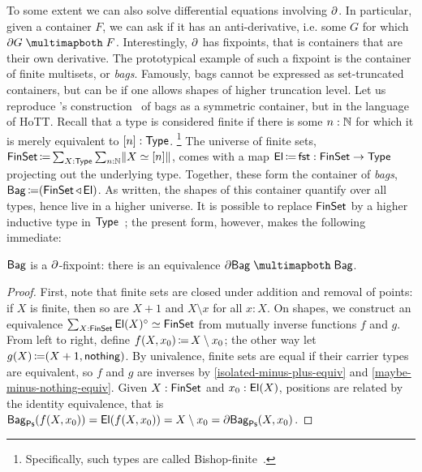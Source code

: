 To some extent we can also solve differential equations involving \( \partial \).
In particular, given a container \( F \), we can ask if it has an anti-derivative,
i.e. some \( G \) for which \( \CartIso{\Der{G}}{F} \).
Interestingly, \( \partial \) has fixpoints, that is containers that are their own derivative.
The prototypical example of such a fixpoint is the container of finite multisets, or \emph{bags}.
Famously, bags cannot be expressed as set-truncated containers, but can be if one allows shapes of higher truncation level.
Let us reproduce \citeauthor{Gylterud2011}'s construction~\cite[{Example~3.6.1}]{Gylterud2011} of bags as a symmetric container,
but in the language of HoTT.
Recall that a type is considered finite
if there is some \( n : \operatorname{\mathbb{N}} \) for which it is merely equivalent to \( \lbrack n\rbrack : \operatorname{\mathsf{Type}} \).%
\footnote{Specifically, such types are called Bishop-finite~\cite[{Definition~4.4}]{FruminEtAl2018FiniteSetsHomotopy}.}
The universe of finite sets,
\( \operatorname{\mathsf{FinSet}} \operatorname{\mathrel{\coloneq}} \sum_{X : \operatorname{\mathsf{Type}}} \sum_{n : \operatorname{\mathbb{N}}} \lVert X \simeq \lbrack n\rbrack \rVert \),
comes with a map \( \operatorname{\mathsf{El}} \operatorname{\mathrel{\coloneq}} \operatorname{\mathsf{fst}} : \operatorname{\mathsf{FinSet}} \to \operatorname{\mathsf{Type}} \) projecting out the underlying type.
Together, these form the container of \emph{bags}, \( \operatorname{\mathsf{Bag}} \operatorname{\mathrel{\coloneq}} (\operatorname{\mathsf{FinSet}}\mathbin{\triangleleft}\operatorname{\mathsf{El}}) \).
As written, the shapes of this container quantify over all types, hence live in a higher universe.
It is possible to replace \( \operatorname{\mathsf{FinSet}} \) by a higher inductive type in \( \operatorname{\mathsf{Type}} \)~\cite[Theorem~25]{FinsterEtAl2021CartesianBicategoryPolynomial};
the present form, however, makes the following immediate:
\begin{proposition}\label{bag-fixed-point}
  \( \operatorname{\mathsf{Bag}} \) is a \( \partial \)-fixpoint:
  there is an equivalence \( \CartIso{\Der{\Bag}}{\Bag} \).
  \begin{proof}
    First, note that finite sets are closed under addition and removal of points:
    if \( X \) is finite, then so are \( X + 1 \) and \( X \setminus x \) for all \( x : X \).
    On shapes, we construct an equivalence
    \(
      \sum_{X : \operatorname{\mathsf{FinSet}}} \operatorname{\mathsf{El}}(X)^{\circ} \simeq \operatorname{\mathsf{FinSet}}
    \)
    from mutually inverse functions \( f \) and \( g \).
    From left to right, define \( f(X, x_0) \operatorname{\mathrel{\coloneq}} X \setminus x_0 \);
    the other way let \( g(X) \operatorname{\mathrel{\coloneq}} (X + 1 , \operatorname{\mathsf{nothing}}) \).
    By univalence, finite sets are equal if their carrier types are equivalent,
    so \( f \) and \( g \) are inverses by \autoref{isolated-minus-plus-equiv} and \autoref{maybe-minus-nothing-equiv}.
    Given \( X : \operatorname{\mathsf{FinSet}} \) and \( x_0 : \operatorname{\mathsf{El}}(X) \), positions are related by the identity equivalence,
    that is
    \(
      \operatorname{\mathsf{Bag}}_{\operatorname{\mathsf{Ps}}}(f(X, x_0)) = \operatorname{\mathsf{El}}(f(X, x_0)) = X \setminus x_0 = \partial{\operatorname{\mathsf{Bag}}}_{\operatorname{\mathsf{Ps}}}(X, x_0)
    \).
  \end{proof}
\end{proposition}

